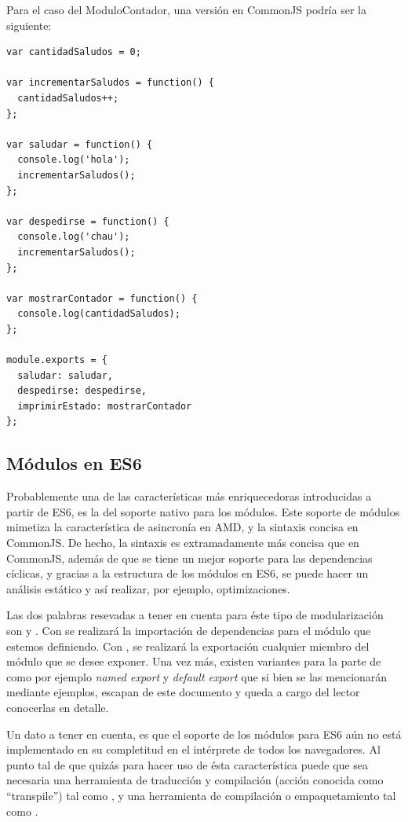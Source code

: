 Para el caso del ModuloContador, una versión en CommonJS podría ser la siguiente:

\begin{lstlisting}[title={Modulo contador en CommonJS}]
var cantidadSaludos = 0;

var incrementarSaludos = function() {
  cantidadSaludos++;
};

var saludar = function() {
  console.log('hola');
  incrementarSaludos();
};

var despedirse = function() {
  console.log('chau');
  incrementarSaludos();
};

var mostrarContador = function() {
  console.log(cantidadSaludos);
};

module.exports = {
  saludar: saludar,
  despedirse: despedirse,
  imprimirEstado: mostrarContador
};
\end{lstlisting}

\subsection{Módulos	en ES6}

Probablemente una de las características más enriquecedoras introducidas a partir de ES6, es la del soporte nativo para los módulos. Este soporte de módulos mimetiza la característica de asincronía en AMD, y la sintaxis concisa en CommonJS. De hecho, la sintaxis es extramadamente más concisa que en CommonJS, además de que se tiene un mejor soporte para las dependencias cíclicas, y gracias a la estructura de los módulos en ES6, se puede hacer un análisis estático y así realizar, por ejemplo, optimizaciones.

Las dos palabras resevadas a tener en cuenta para éste tipo de modularización son  y . Con  se realizará la importación de dependencias para el módulo que estemos definiendo. Con , se realizará la exportación cualquier miembro del módulo que se desee exponer. Una vez más, existen variantes para la parte de  como por ejemplo \textit{named export} y \textit{default export} que si bien se las mencionarán mediante ejemplos, escapan de este documento y queda a cargo del lector conocerlas en detalle.

Un dato a tener en cuenta, es que el soporte de los módulos para ES6 aún no está implementado en su completitud en el intérprete de todos los navegadores. Al punto tal de que quizás para hacer uso de ésta característica puede que sea necesaria una herramienta de traducción y compilación (acción conocida como "`transpile"') tal como , y una herramienta de compilación o empaquetamiento tal como .


